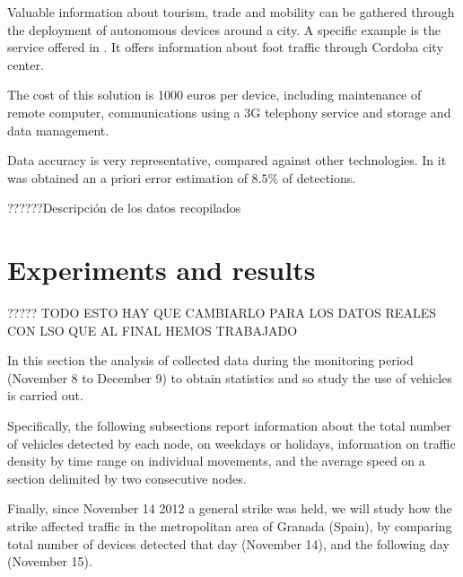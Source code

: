 \documentclass[preprint,authoryear,12pt]{elsarticle}
\begin{document}
Valuable information about tourism, trade and mobility can be gathered through the deployment of autonomous devices around a city. A specific example is the service offered in \cite{numerodepersonas}. It offers information about foot traffic through Cordoba city center.

The cost of this solution is 1000 euros per device, including maintenance of remote computer, communications using a 3G telephony service and storage and data management.

Data accuracy is very representative, compared against other technologies.
In \cite{estudioprecision} it was obtained an a priori error estimation of $8.5\%$ of detections.


??????Descripción de los datos recopilados

\section{Experiments and results}
\label{sec:experiments}

????? TODO ESTO HAY QUE CAMBIARLO PARA LOS DATOS REALES CON LSO QUE AL FINAL HEMOS TRABAJADO

In this section the analysis of collected data during the monitoring period (November 8 to December 9) to obtain statistics and so study the use of vehicles is carried out.

Specifically, the following subsections report information about the total number of vehicles detected by each node, on weekdays or holidays, information on traffic density by time range on individual movements, and the average speed on a section delimited by two consecutive nodes.

Finally, since November 14 2012 a general strike was held, we will study how the strike affected traffic in the metropolitan area of Granada (Spain), by comparing total number of devices detected that day (November 14), and the following day (November 15).
\end{document}
